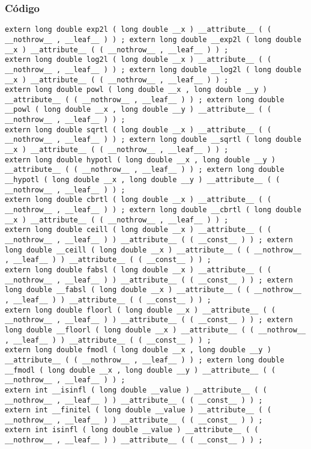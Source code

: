 \documentclass{beamer}
\begin{document}
\begin{frame}[fragile]
\frametitle{C\'odigo}
\begin{verbatim}
extern long double exp2l ( long double __x ) __attribute__ ( ( __nothrow__ , __leaf__ ) ) ; extern long double __exp2l ( long double __x ) __attribute__ ( ( __nothrow__ , __leaf__ ) ) ; 
extern long double log2l ( long double __x ) __attribute__ ( ( __nothrow__ , __leaf__ ) ) ; extern long double __log2l ( long double __x ) __attribute__ ( ( __nothrow__ , __leaf__ ) ) ; 
extern long double powl ( long double __x , long double __y ) __attribute__ ( ( __nothrow__ , __leaf__ ) ) ; extern long double __powl ( long double __x , long double __y ) __attribute__ ( ( __nothrow__ , __leaf__ ) ) ; 
extern long double sqrtl ( long double __x ) __attribute__ ( ( __nothrow__ , __leaf__ ) ) ; extern long double __sqrtl ( long double __x ) __attribute__ ( ( __nothrow__ , __leaf__ ) ) ; 
extern long double hypotl ( long double __x , long double __y ) __attribute__ ( ( __nothrow__ , __leaf__ ) ) ; extern long double __hypotl ( long double __x , long double __y ) __attribute__ ( ( __nothrow__ , __leaf__ ) ) ; 
extern long double cbrtl ( long double __x ) __attribute__ ( ( __nothrow__ , __leaf__ ) ) ; extern long double __cbrtl ( long double __x ) __attribute__ ( ( __nothrow__ , __leaf__ ) ) ; 
extern long double ceill ( long double __x ) __attribute__ ( ( __nothrow__ , __leaf__ ) ) __attribute__ ( ( __const__ ) ) ; extern long double __ceill ( long double __x ) __attribute__ ( ( __nothrow__ , __leaf__ ) ) __attribute__ ( ( __const__ ) ) ; 
extern long double fabsl ( long double __x ) __attribute__ ( ( __nothrow__ , __leaf__ ) ) __attribute__ ( ( __const__ ) ) ; extern long double __fabsl ( long double __x ) __attribute__ ( ( __nothrow__ , __leaf__ ) ) __attribute__ ( ( __const__ ) ) ; 
extern long double floorl ( long double __x ) __attribute__ ( ( __nothrow__ , __leaf__ ) ) __attribute__ ( ( __const__ ) ) ; extern long double __floorl ( long double __x ) __attribute__ ( ( __nothrow__ , __leaf__ ) ) __attribute__ ( ( __const__ ) ) ; 
extern long double fmodl ( long double __x , long double __y ) __attribute__ ( ( __nothrow__ , __leaf__ ) ) ; extern long double __fmodl ( long double __x , long double __y ) __attribute__ ( ( __nothrow__ , __leaf__ ) ) ; 
extern int __isinfl ( long double __value ) __attribute__ ( ( __nothrow__ , __leaf__ ) ) __attribute__ ( ( __const__ ) ) ; 
extern int __finitel ( long double __value ) __attribute__ ( ( __nothrow__ , __leaf__ ) ) __attribute__ ( ( __const__ ) ) ; 
extern int isinfl ( long double __value ) __attribute__ ( ( __nothrow__ , __leaf__ ) ) __attribute__ ( ( __const__ ) ) ; 
\end{verbatim}
\end{frame}
\end{document}
